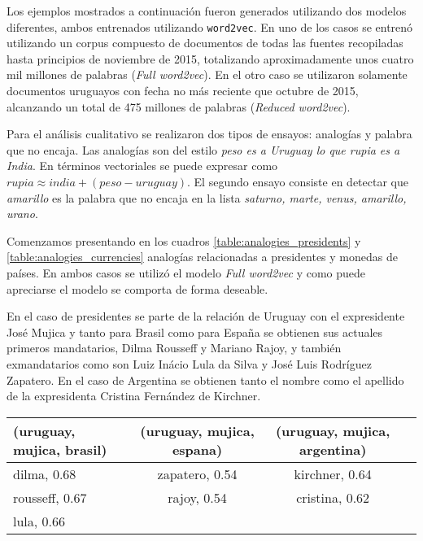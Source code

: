 Los ejemplos mostrados a continuación fueron generados utilizando dos modelos diferentes, ambos
entrenados utilizando \texttt{word2vec}. En uno de los casos se entrenó utilizando un corpus
compuesto de documentos de todas las fuentes recopiladas hasta principios de noviembre de 2015,
totalizando aproximadamente unos cuatro mil millones de palabras (\textit{Full word2vec}). En el
otro caso se utilizaron solamente documentos uruguayos con fecha no más reciente que octubre de
2015, alcanzando un total de 475 millones de palabras (\textit{Reduced word2vec}).

Para el análisis cualitativo se realizaron dos tipos de ensayos: analogías y palabra que no encaja. Las
analogías son del estilo \textit{peso es a Uruguay lo que rupia es a India}. En términos vectoriales
se puede expresar como $rupia \approx india + (peso - uruguay)$. El segundo ensayo consiste en
detectar que \textit{amarillo} es la palabra que no encaja en la lista \textit{saturno, marte, venus,
amarillo, urano}.

Comenzamos presentando en los cuadros \ref{table:analogies_presidents} y
\ref{table:analogies_currencies} analogías relacionadas a presidentes y monedas de países. En ambos
casos se utilizó el modelo \textit{Full word2vec} y como puede apreciarse el modelo se comporta de
forma deseable.

En el caso de presidentes se parte de la relación de Uruguay con el expresidente José Mujica y tanto
para Brasil como para España se obtienen sus actuales primeros mandatarios, Dilma Rousseff y
Mariano Rajoy, y también exmandatarios como son Luiz Inácio Lula da Silva y José Luis Rodríguez
Zapatero. En el caso de Argentina se obtienen tanto el nombre como el apellido de la expresidenta
Cristina Fernández de Kirchner.

\begin{table*}[ht]
    \centering
    \begin{tabular}{lccc}
        \hline
        (uruguay, mujica, brasil) & (uruguay, mujica, espana) & (uruguay, mujica, argentina)\\
        \hline
        dilma, 0.68 & zapatero, 0.54 & kirchner, 0.64\\
        rousseff, 0.67 & rajoy, 0.54 & cristina, 0.62\\
        lula, 0.66\\
        \hline
    \end{tabular}
    \caption{Analogías para países y presidentes.}
    \label{table:analogies_presidents}
\end{table*}

